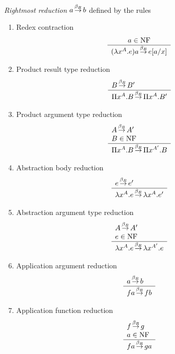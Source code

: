 \begin{definition}
    \emph{Rightmost reduction} $a {{\,\stackrel{\beta_R}{\to}\,}} b$ defined by the rules
    \begin{enumerate}
        \item Redex contraction
            $$
                \begin{array}{c} 
                    a \in {\text{NF}}
                 \\ \hline 
                    (\lambda x^A. e) a {{\,\stackrel{\beta_R}{\to}\,}} e[a/x]
                \end{array}
            $$

        \item Product result type reduction
            $$
            \begin{array}{l} 
                B {{\,\stackrel{\beta_R}{\to}\,}} B'
             \\ \hline 
                \Pi x^A.B {{\,\stackrel{\beta_R}{\to}\,}} \Pi x^A. B'
            \end{array}
            $$

        \item Product argument type reduction
            $$
            \begin{array}{l} 
                A {{\,\stackrel{\beta_R}{\to}\,}} A'
                \\
                B \in {\text{NF}}
             \\ \hline 
                \Pi x^A.B {{\,\stackrel{\beta_R}{\to}\,}} \Pi x^{A'}. B
            \end{array}
            $$

        \item Abstraction body reduction
            $$
            \begin{array}{l} 
                e {{\,\stackrel{\beta_R}{\to}\,}} e'
             \\ \hline 
                \lambda x^A.e {{\,\stackrel{\beta_R}{\to}\,}} \lambda x^A. e'
            \end{array}
            $$

        \item Abstraction argument type reduction
            $$
            \begin{array}{l} 
                A {{\,\stackrel{\beta_R}{\to}\,}} A'
                \\
                e \in {\text{NF}}
             \\ \hline 
                \lambda x^A.e {{\,\stackrel{\beta_R}{\to}\,}} \lambda x^{A'}. e
            \end{array}
            $$

        \item Application argument reduction
            $$
            \begin{array}{l} 
                a {{\,\stackrel{\beta_R}{\to}\,}} b
             \\ \hline 
                fa {{\,\stackrel{\beta_R}{\to}\,}} fb
            \end{array}
            $$

        \item Application function reduction
            $$
            \begin{array}{l} 
                f {{\,\stackrel{\beta_R}{\to}\,}} g
                \\
                a \in {\text{NF}}
             \\ \hline 
                fa {{\,\stackrel{\beta_R}{\to}\,}} ga
            \end{array}
            $$
    \end{enumerate}
\end{definition}





